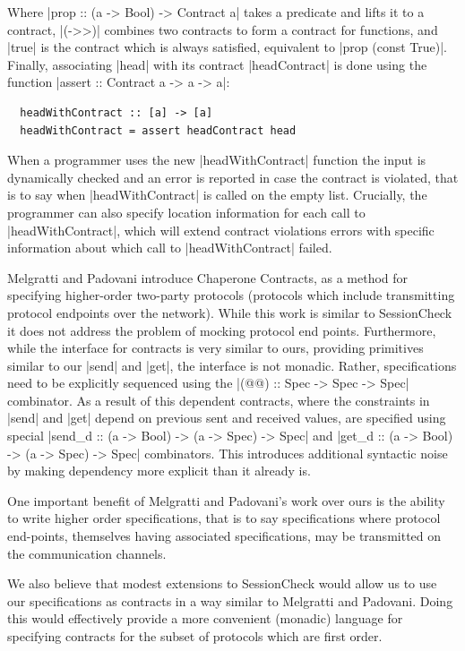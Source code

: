 \documentclass{article}
\begin{document}
%
Where |prop :: (a -> Bool) -> Contract a| takes a predicate and lifts it to a
contract, |(->>)| combines two contracts to form a contract for functions, and
|true| is the contract which is always satisfied, equivalent to
|prop (const True)|.
%
Finally, associating |head| with its contract |headContract| is done using the
function |assert :: Contract a -> a -> a|:
%

\begin{minipage}{\linewidth}
  \begin{verbatim}
  headWithContract :: [a] -> [a]
  headWithContract = assert headContract head
\end{verbatim}
\end{minipage}

%
When a programmer uses the new |headWithContract| function the input is
dynamically checked and an error is reported in case the contract is violated,
that is to say when |headWithContract| is called on the empty list.
%
Crucially, the programmer can also specify location information for each call to
|headWithContract|, which will extend contract violations errors with specific
information about which call to |headWithContract| failed.

Melgratti and Padovani \cite{ChaperoneContracts} introduce Chaperone Contracts,
as a method for specifying higher-order two-party protocols (protocols which
include transmitting protocol endpoints over the network).
%
While this work is similar to SessionCheck it does not address the problem
of mocking protocol end points.
%
Furthermore, while the interface for contracts is very similar to ours,
providing primitives similar to our |send| and |get|, the interface is not
monadic.
%
Rather, specifications need to be explicitly sequenced using the
|(@@) :: Spec -> Spec -> Spec| combinator.
%
As a result of this dependent contracts, where the constraints in |send| and
|get| depend on previous sent and received values, are specified using
special |send_d :: (a -> Bool) -> (a -> Spec) -> Spec| and
|get_d :: (a -> Bool) -> (a -> Spec) -> Spec| combinators.
%
This introduces additional syntactic noise by making dependency more explicit
than it already is.

One important benefit of Melgratti and Padovani's work over ours is the ability
to write higher order specifications, that is to say specifications where protocol
end-points, themselves having associated specifications, may be transmitted
on the communication channels.

We also believe that modest extensions to SessionCheck would allow us to use
our specifications as contracts in a way similar to Melgratti and Padovani.
%
Doing this would effectively provide a more convenient (monadic) language for
specifying contracts for the subset of protocols which are first order.
%
\end{document}
